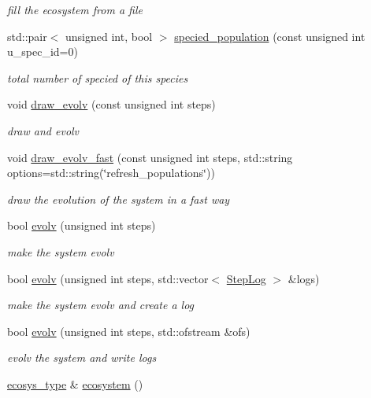 \begin{DoxyCompactItemize}
\begin{DoxyCompactList}\small\item\em fill the ecosystem from a file \end{DoxyCompactList}\item 
std::pair$<$ unsigned int, bool $>$ \hyperlink{classEcosystemContainer_a5330060eabcdf726931e3c8984a71073}{specied\_\-population} (const unsigned int u\_\-spec\_\-id=0)
\begin{DoxyCompactList}\small\item\em total number of specied of this species \end{DoxyCompactList}\item 
void \hyperlink{classEcosystemContainer_a8f3fecee71e06e35a32ec35e3c01f924}{draw\_\-evolv} (const unsigned int steps)
\begin{DoxyCompactList}\small\item\em draw and evolv \end{DoxyCompactList}\item 
void \hyperlink{classEcosystemContainer_a9aedfda6204c1569234bf41489b88bd4}{draw\_\-evolv\_\-fast} (const unsigned int steps, std::string options=std::string(\char`\"{}refresh\_\-populations\char`\"{}))
\begin{DoxyCompactList}\small\item\em draw the evolution of the system in a fast way \end{DoxyCompactList}\item 
bool \hyperlink{classEcosystemContainer_a37e7e126c7ee9855a4fa3218711a5b1d}{evolv} (unsigned int steps)
\begin{DoxyCompactList}\small\item\em make the system evolv \end{DoxyCompactList}\item 
bool \hyperlink{classEcosystemContainer_a257157a8dbe84b0f5abcbde4fab0c9ae}{evolv} (unsigned int steps, std::vector$<$ \hyperlink{structStepLog}{StepLog} $>$ \&logs)
\begin{DoxyCompactList}\small\item\em make the system evolv and create a log \end{DoxyCompactList}\item 
bool \hyperlink{classEcosystemContainer_acbdecb83a3b8b0f4433b0a01a04d7af4}{evolv} (unsigned int steps, std::ofstream \&ofs)
\begin{DoxyCompactList}\small\item\em evolv the system and write logs \end{DoxyCompactList}\item 
\hypertarget{classEcosystemContainer_a6e175385de623dcbc018e5d8ae5c8af4}{
\hyperlink{classEcosystemContainer_a52c612c138ad2af06dcf353e6c541345}{ecosys\_\-type} \& \hyperlink{classEcosystemContainer_a6e175385de623dcbc018e5d8ae5c8af4}{ecosystem} ()}
\label{classEcosystemContainer_a6e175385de623dcbc018e5d8ae5c8af4}


\end{DoxyCompactItemize}
